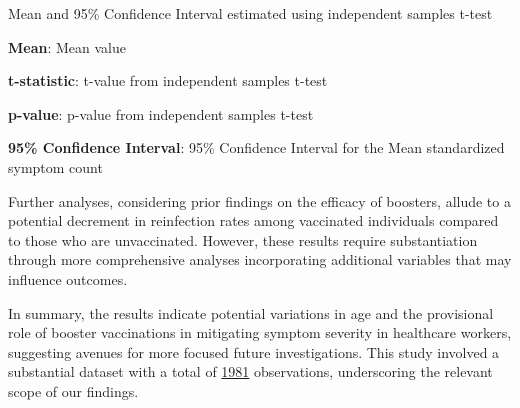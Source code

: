 \documentclass[11pt]{article}
\begin{document}
\begin{table}[h]
\caption{\protect\hyperlink{file-table-2-pkl}{Association between booster shot \& symptom count}}
\label{table:table2}
\begin{threeparttable}
\renewcommand{\TPTminimum}{\linewidth}
\begin{tablenotes}
\footnotesize
\item Mean and 95\% Confidence Interval estimated using independent samples t-test
\item \textbf{Mean}: Mean value
\item \textbf{t-statistic}: t-value from independent samples t-test
\item \textbf{p-value}: p-value from independent samples t-test
\item \textbf{95\% Confidence Interval}: 95\% Confidence Interval for the Mean standardized symptom count
\end{tablenotes}
\end{threeparttable}
\end{table}

Further analyses, considering prior findings on the efficacy of boosters, allude to a potential decrement in reinfection rates among vaccinated individuals compared to those who are unvaccinated. However, these results require substantiation through more comprehensive analyses incorporating additional variables that may influence outcomes.

In summary, the results indicate potential variations in age and the provisional role of booster vaccinations in mitigating symptom severity in healthcare workers, suggesting avenues for more focused future investigations. This study involved a substantial dataset with a total of \hyperlink{R0a}{1981} observations, underscoring the relevant scope of our findings.
\end{document}
